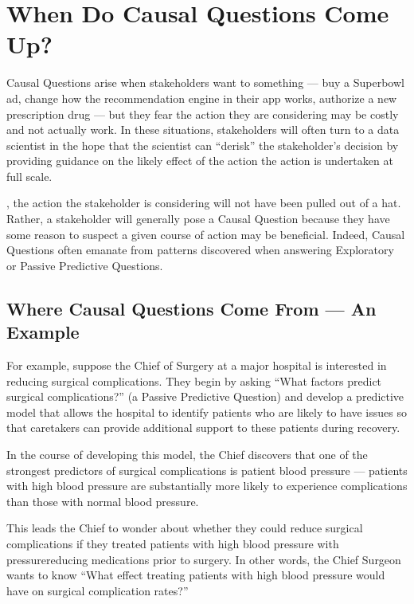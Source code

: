 \documentclass[letterpaper,10pt,english]{jupyterBook}
\begin{document}
\section{When Do Causal Questions Come Up?}
\label{\detokenize{30_questions/35_using_causal_questions:when-do-causal-questions-come-up}}
\sphinxAtStartPar
Causal Questions arise when stakeholders want to  something — buy a Superbowl ad, change how the recommendation engine in their app works, authorize a new prescription drug — but they fear the action they are considering may be costly and not actually work. In these situations, stakeholders will often turn to a data scientist in the hope that the scientist can “de\sphinxhyphen{}risk” the stakeholder’s decision by providing guidance on the likely effect of the action  the action is undertaken at full scale.

\sphinxAtStartPar
{}, the action the stakeholder is considering will not have been pulled out of a hat. Rather, a stakeholder will generally pose a Causal Question because they have some reason to suspect a given course of action may be beneficial. Indeed, Causal Questions often emanate from patterns discovered when answering Exploratory or Passive Predictive Questions.


\subsection{Where Causal Questions Come From — An Example}
\label{\detokenize{30_questions/35_using_causal_questions:where-causal-questions-come-from-an-example}}
\sphinxAtStartPar
For example, suppose the Chief of Surgery at a major hospital is interested in reducing surgical complications. They begin by asking “What factors predict surgical complications?” (a Passive Predictive Question) and develop a predictive model that allows the hospital to identify patients who are likely to have issues so that caretakers can provide additional support to these patients during recovery.

\sphinxAtStartPar
In the course of developing this model, the Chief discovers that one of the strongest predictors of surgical complications is patient blood pressure — patients with high blood pressure are substantially more likely to experience complications than those with normal blood pressure.

\sphinxAtStartPar
This leads the Chief to wonder about whether they could reduce surgical complications if they treated patients with high blood pressure with pressure\sphinxhyphen{}reducing medications prior to surgery. In other words, the Chief Surgeon wants to know “What effect treating patients with high blood pressure would have on surgical complication rates?”
\end{document}
